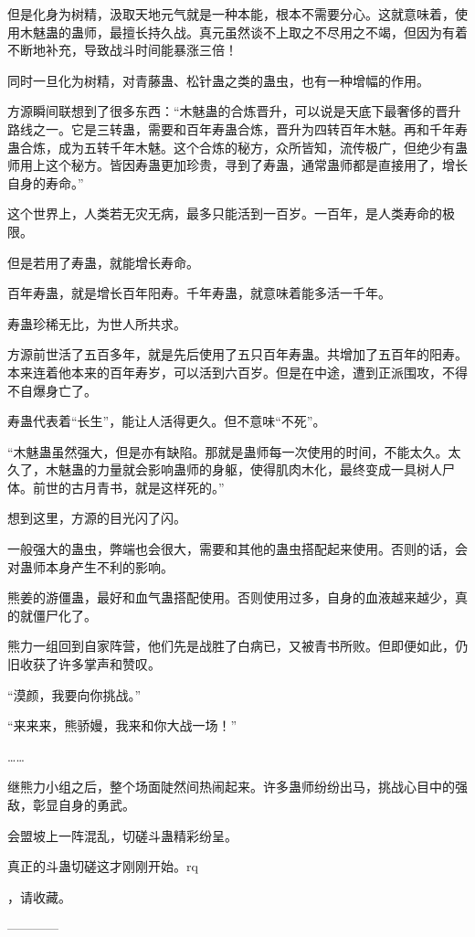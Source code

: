 \begin{this_body}
但是化身为树精，汲取天地元气就是一种本能，根本不需要分心。这就意味着，使用木魅蛊的蛊师，最擅长持久战。真元虽然谈不上取之不尽用之不竭，但因为有着不断地补充，导致战斗时间能暴涨三倍！

同时一旦化为树精，对青藤蛊、松针蛊之类的蛊虫，也有一种增幅的作用。

方源瞬间联想到了很多东西：“木魅蛊的合炼晋升，可以说是天底下最奢侈的晋升路线之一。它是三转蛊，需要和百年寿蛊合炼，晋升为四转百年木魅。再和千年寿蛊合炼，成为五转千年木魅。这个合炼的秘方，众所皆知，流传极广，但绝少有蛊师用上这个秘方。皆因寿蛊更加珍贵，寻到了寿蛊，通常蛊师都是直接用了，增长自身的寿命。”

这个世界上，人类若无灾无病，最多只能活到一百岁。一百年，是人类寿命的极限。

但是若用了寿蛊，就能增长寿命。

百年寿蛊，就是增长百年阳寿。千年寿蛊，就意味着能多活一千年。

寿蛊珍稀无比，为世人所共求。

方源前世活了五百多年，就是先后使用了五只百年寿蛊。共增加了五百年的阳寿。本来连着他本来的百年寿岁，可以活到六百岁。但是在中途，遭到正派围攻，不得不自爆身亡了。

寿蛊代表着“长生”，能让人活得更久。但不意味“不死”。

“木魅蛊虽然强大，但是亦有缺陷。那就是蛊师每一次使用的时间，不能太久。太久了，木魅蛊的力量就会影响蛊师的身躯，使得肌肉木化，最终变成一具树人尸体。前世的古月青书，就是这样死的。”

想到这里，方源的目光闪了闪。

一般强大的蛊虫，弊端也会很大，需要和其他的蛊虫搭配起来使用。否则的话，会对蛊师本身产生不利的影响。

熊姜的游僵蛊，最好和血气蛊搭配使用。否则使用过多，自身的血液越来越少，真的就僵尸化了。

熊力一组回到自家阵营，他们先是战胜了白病已，又被青书所败。但即便如此，仍旧收获了许多掌声和赞叹。

“漠颜，我要向你挑战。”

“来来来，熊骄嫚，我来和你大战一场！”

……

继熊力小组之后，整个场面陡然间热闹起来。许多蛊师纷纷出马，挑战心目中的强敌，彰显自身的勇武。

会盟坡上一阵混乱，切磋斗蛊精彩纷呈。

真正的斗蛊切磋这才刚刚开始。rq

，请收藏。

------------

\end{this_body}

